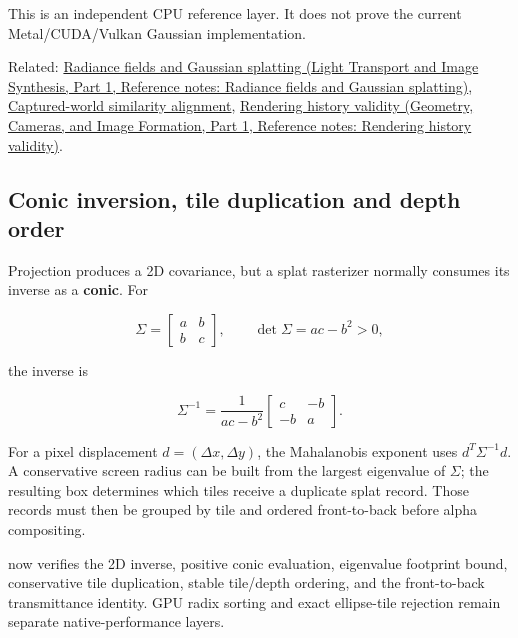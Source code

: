 This is an independent CPU reference layer. It does not prove the current Metal/CUDA/Vulkan Gaussian implementation.

Related: \href{../04-Light-Transport-and-Image-Synthesis-P01/main.pdf\#appendix-c5b332e400e7}{Radiance fields and Gaussian splatting (Light Transport and Image Synthesis, Part 1, Reference notes: Radiance fields and Gaussian splatting)}, \hyperref[appendix-5f40b4fea463]{Captured-world similarity alignment}, \href{../03-Geometry-Cameras-and-Image-Formation-P01/main.pdf\#appendix-2e7e9fd28a2c}{Rendering history validity (Geometry, Cameras, and Image Formation, Part 1, Reference notes: Rendering history validity)}.

\subsection{Conic inversion, tile duplication and depth order}\label{appendix-24269cb6977c-conic-inversion-tile-duplication-and-depth-order}

\hypertarget{appendix-24269cb6977c-conic-inversion-tile-duplication-and-depth-order}{}

Projection produces a 2D covariance, but a splat rasterizer normally consumes its inverse as a \textbf{conic}. For

\[
\Sigma=
\begin{bmatrix}
a&b\\
b&c
\end{bmatrix},
\qquad
\det\Sigma=ac-b^2>0,
\]

the inverse is

\[
\Sigma^{-1}
=
\frac{1}{ac-b^2}
\begin{bmatrix}
c&-b\\
-b&a
\end{bmatrix}.
\]

For a pixel displacement \(d=(\Delta x,\Delta y)\), the Mahalanobis exponent uses \(d^T\Sigma^{-1}d\). A conservative screen radius can be built from the largest eigenvalue of \(\Sigma\); the resulting box determines which tiles receive a duplicate splat record. Those records must then be grouped by tile and ordered front-to-back before alpha compositing.

 now verifies the 2D inverse, positive conic evaluation, eigenvalue footprint bound, conservative tile duplication, stable tile/depth ordering, and the front-to-back transmittance identity. GPU radix sorting and exact ellipse-tile rejection remain separate native-performance layers.
